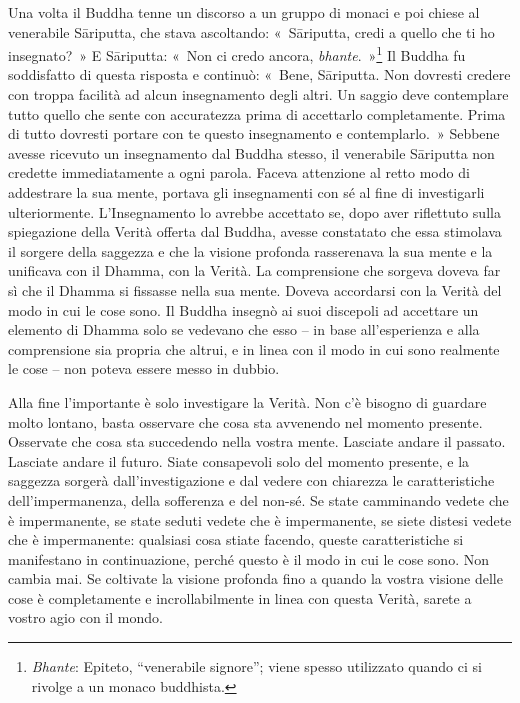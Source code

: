Una volta il Buddha tenne un discorso a un gruppo di monaci e poi chiese
al venerabile Sāriputta, che stava ascoltando: «~Sāriputta, credi a
quello che ti ho insegnato?~» E Sāriputta: «~Non ci credo ancora,
\emph{bhante}.~»\footnote{\emph{Bhante}: Epiteto, ``venerabile signore''; viene spesso
  utilizzato quando ci si rivolge a un monaco buddhista.}
Il Buddha fu soddisfatto di questa risposta e continuò:
«~Bene, Sāriputta. Non dovresti credere con troppa facilità ad alcun
insegnamento degli altri. Un saggio deve contemplare tutto quello che
sente con accuratezza prima di accettarlo completamente. Prima di tutto
dovresti portare con te questo insegnamento e contemplarlo.~» Sebbene
avesse ricevuto un insegnamento dal Buddha stesso, il venerabile
Sāriputta non credette immediatamente a ogni parola. Faceva attenzione
al retto modo di addestrare la sua mente, portava gli insegnamenti con
sé al fine di investigarli ulteriormente. L'Insegnamento lo avrebbe
accettato se, dopo aver riflettuto sulla spiegazione della Verità
offerta dal Buddha, avesse constatato che essa stimolava il sorgere
della saggezza e che la visione profonda rasserenava la sua mente e la
unificava con il Dhamma, con la Verità. La comprensione che sorgeva
doveva far sì che il Dhamma si fissasse nella sua mente. Doveva
accordarsi con la Verità del modo in cui le cose sono. Il Buddha insegnò
ai suoi discepoli ad accettare un elemento di Dhamma solo se vedevano
che esso -- in base all'esperienza e alla comprensione sia propria che
altrui, e in linea con il modo in cui sono realmente le cose -- non
poteva essere messo in dubbio.

Alla fine l'importante è solo investigare la Verità. Non c'è bisogno di
guardare molto lontano, basta osservare che cosa sta avvenendo nel
momento presente. Osservate che cosa sta succedendo nella vostra mente.
Lasciate andare il passato. Lasciate andare il futuro. Siate consapevoli
solo del momento presente, e la saggezza sorgerà dall'investigazione e
dal vedere con chiarezza le caratteristiche dell'impermanenza, della
sofferenza e del non-sé. Se state camminando vedete che è impermanente,
se state seduti vedete che è impermanente, se siete distesi vedete che è
impermanente: qualsiasi cosa stiate facendo, queste caratteristiche si
manifestano in continuazione, perché questo è il modo in cui le cose
sono. Non cambia mai. Se coltivate la visione profonda fino a quando la
vostra visione delle cose è completamente e incrollabilmente in linea
con questa Verità, sarete a vostro agio con il mondo.

